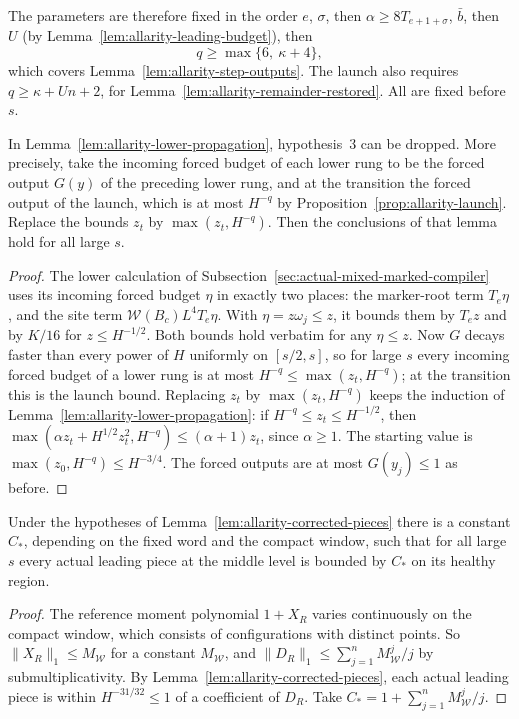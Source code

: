 The parameters are therefore fixed in the order $e$, $\sigma$, then
$\alpha\ge8T_{e+1+\sigma}$, $\bar b$, then
$U$ (by Lemma~\ref{lem:allarity-leading-budget}), then
\[
 q\ge\max\{6,\ \kappa+4\},
\]
which covers Lemma~\ref{lem:allarity-step-outputs}. The launch also
requires $q\ge\kappa+Un+2$, for
Lemma~\ref{lem:allarity-remainder-restored}. All are fixed before $s$.

\begin{lemma}
\label{lem:allarity-lower-forced}
In Lemma~\ref{lem:allarity-lower-propagation}, hypothesis~3 can be
dropped. More precisely, take the incoming forced budget of each lower
rung to be the forced output $G(y)$ of the preceding lower rung, and at
the transition the forced output of the launch, which is at most $H^{-q}$
by Proposition~\ref{prop:allarity-launch}. Replace the bounds $z_t$ by
$\max(z_t,H^{-q})$. Then the conclusions of that lemma hold for all large
$s$.
\end{lemma}
\begin{proof}
The lower calculation of Subsection~\ref{sec:actual-mixed-marked-compiler}
uses its incoming forced budget $\eta$ in exactly two places: the
marker-root term $T_e\eta$, and the site term
$\mathcal W(B_c)L^4T_e\eta$. With $\eta=z\omega_j\le z$, it bounds them by
$T_ez$ and by $K/16$ for $z\le H^{-1/2}$. Both bounds hold verbatim for
any $\eta\le z$. Now $G$ decays faster than every power of $H$ uniformly
on $[s/2,s]$, so for large $s$ every incoming forced budget of a lower
rung is at most $H^{-q}\le\max(z_t,H^{-q})$; at the transition this is
the launch bound. Replacing $z_t$ by $\max(z_t,H^{-q})$ keeps the
induction of Lemma~\ref{lem:allarity-lower-propagation}: if
$H^{-q}\le z_t\le H^{-1/2}$, then
$\max(\alpha z_t+H^{1/2}z_t^2,H^{-q})\le(\alpha+1)z_t$, since
$\alpha\ge1$. The starting value is $\max(z_0,H^{-q})\le H^{-3/4}$. The
forced outputs are at most $G(y_j)\le1$ as before.
\end{proof}

\begin{lemma}
\label{lem:allarity-amplitude}
Under the hypotheses of Lemma~\ref{lem:allarity-corrected-pieces} there is
a constant $C_*$, depending on the fixed word and the compact window,
such that for all large $s$ every actual leading piece at the middle level
is bounded by $C_*$ on its healthy region.
\end{lemma}
\begin{proof}
The reference moment polynomial $1+X_R$ varies continuously on the
compact window, which consists of configurations with distinct points.
So $\|X_R\|_1\le M_{\mathcal W}$ for a constant $M_{\mathcal W}$, and
$\|D_R\|_1\le\sum_{j=1}^n M_{\mathcal W}^j/j$ by submultiplicativity. By
Lemma~\ref{lem:allarity-corrected-pieces}, each actual leading piece is
within $H^{-31/32}\le1$ of a coefficient of $D_R$. Take
$C_*=1+\sum_{j=1}^nM_{\mathcal W}^j/j$.
\end{proof}

